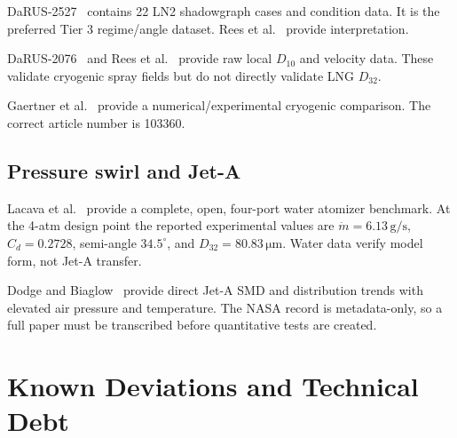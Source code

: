 \documentclass[11pt]{article}
\newcommand{\unit}[1]{\,\mathrm{#1}}
\begin{document}
DaRUS-2527~\cite{darus2527} contains 22 LN2 shadowgraph cases and condition data.
It is the preferred Tier 3 regime/angle dataset. Rees et al.~\cite{reesmorphology}
provide interpretation.

DaRUS-2076~\cite{darus2076} and Rees et al.~\cite{rees2020} provide raw local
$D_{10}$ and velocity data. These validate cryogenic spray fields but do not directly
validate LNG $D_{32}$.

Gaertner et al.~\cite{gaertner2020} provide a numerical/experimental cryogenic
comparison. The correct article number is 103360.

\subsection{Pressure swirl and Jet-A}

Lacava et al.~\cite{lacava2004} provide a complete, open, four-port water atomizer
benchmark. At the 4-atm design point the reported experimental values are
$\dot m=6.13\unit{g/s}$, $C_d=0.2728$, semi-angle $34.5^\circ$, and
$D_{32}=80.83\unit{\mu m}$. Water data verify model form, not Jet-A transfer.

Dodge and Biaglow~\cite{dodge1986} provide direct Jet-A SMD and distribution trends
with elevated air pressure and temperature. The NASA record is metadata-only, so a
full paper must be transcribed before quantitative tests are created.

\section{Known Deviations and Technical Debt}
\end{document}
